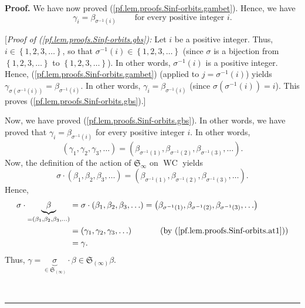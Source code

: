 \documentclass[numbers=enddot,12pt,final,onecolumn,notitlepage]{scrartcl}%
\theoremstyle{definition}
\newenvironment{proof}[1][Proof]{\noindent\textbf{#1.} }{\ \rule{0.5em}{0.5em}}
\newenvironment{verlong}{}{}
\begin{document}
\begin{verlong}
\begin{proof}
We have now proved (\ref{pf.lem.proofs.Sinf-orbits.gambet}). Hence, we have%
\begin{equation}
\gamma_{i}=\beta_{\sigma^{-1}\left(  i\right)  }\ \ \ \ \ \ \ \ \ \ \text{for
every positive integer }i. \label{pf.lem.proofs.Sinf-orbits.gbs}%
\end{equation}


[\textit{Proof of (\ref{pf.lem.proofs.Sinf-orbits.gbs}):} Let $i$ be a
positive integer. Thus, $i\in\left\{  1,2,3,\ldots\right\}  $, so that
$\sigma^{-1}\left(  i\right)  \in\left\{  1,2,3,\ldots\right\}  $ (since
$\sigma$ is a bijection from $\left\{  1,2,3,\ldots\right\}  $ to $\left\{
1,2,3,\ldots\right\}  $). In other words, $\sigma^{-1}\left(  i\right)  $ is a
positive integer. Hence, (\ref{pf.lem.proofs.Sinf-orbits.gambet}) (applied to
$j=\sigma^{-1}\left(  i\right)  $) yields $\gamma_{\sigma\left(  \sigma
^{-1}\left(  i\right)  \right)  }=\beta_{\sigma^{-1}\left(  i\right)  }$. In
other words, $\gamma_{i}=\beta_{\sigma^{-1}\left(  i\right)  }$ (since
$\sigma\left(  \sigma^{-1}\left(  i\right)  \right)  =i$). This proves
(\ref{pf.lem.proofs.Sinf-orbits.gbs}).]

Now, we have proved (\ref{pf.lem.proofs.Sinf-orbits.gbs}). In other words, we
have proved that $\gamma_{i}=\beta_{\sigma^{-1}\left(  i\right)  }$ for every
positive integer $i$. In other words,
\begin{equation}
\left(  \gamma_{1},\gamma_{2},\gamma_{3},\ldots\right)  =\left(  \beta
_{\sigma^{-1}\left(  1\right)  },\beta_{\sigma^{-1}\left(  2\right)  }%
,\beta_{\sigma^{-1}\left(  3\right)  },\ldots\right)  .
\label{pf.lem.proofs.Sinf-orbits.at1}%
\end{equation}
Now, the definition of the action of $\mathfrak{S}_{\infty}$ on
$\operatorname*{WC}$ yields
\[
\sigma\cdot\left(  \beta_{1},\beta_{2},\beta_{3},\ldots\right)  =\left(
\beta_{\sigma^{-1}\left(  1\right)  },\beta_{\sigma^{-1}\left(  2\right)
},\beta_{\sigma^{-1}\left(  3\right)  },\ldots\right)  .
\]
Hence,%
\begin{align*}
\sigma\cdot\underbrace{\beta}_{=\left(  \beta_{1},\beta_{2},\beta_{3}%
,\ldots\right)  }  &  =\sigma\cdot\left(  \beta_{1},\beta_{2},\beta_{3}%
,\ldots\right)  =\left(  \beta_{\sigma^{-1}\left(  1\right)  },\beta
_{\sigma^{-1}\left(  2\right)  },\beta_{\sigma^{-1}\left(  3\right)  }%
,\ldots\right) \\
&  =\left(  \gamma_{1},\gamma_{2},\gamma_{3},\ldots\right)
\ \ \ \ \ \ \ \ \ \ \left(  \text{by (\ref{pf.lem.proofs.Sinf-orbits.at1}%
)}\right) \\
&  =\gamma.
\end{align*}
Thus, $\gamma=\underbrace{\sigma}_{\in\mathfrak{S}_{\left(  \infty\right)  }%
}\cdot\beta\in\mathfrak{S}_{\left(  \infty\right)  }\beta$.


\end{proof}
\end{verlong}
\end{document}
